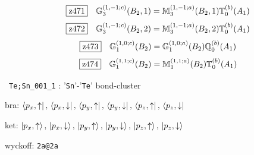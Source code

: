\documentclass[fleqn,10pt,landscape]{jsarticle}
\begin{document}
\begin{dmath*}
\hspace*{3mm}\fbox{z471}\quad \mathbb{G}_{3}^{(1,-1;c)}(B_{2},1)=\mathbb{M}_{3}^{(1,-1;a)}(B_{2},1) \mathbb{T}_{0}^{(b)}(A_{1})
\end{dmath*}
\begin{dmath*}
\hspace*{3mm}\fbox{z472}\quad \mathbb{G}_{3}^{(1,-1;c)}(B_{2},2)=\mathbb{M}_{3}^{(1,-1;a)}(B_{2},2) \mathbb{T}_{0}^{(b)}(A_{1})
\end{dmath*}
\begin{dmath*}
\hspace*{3mm}\fbox{z473}\quad \mathbb{G}_{1}^{(1,0;c)}(B_{2})=\mathbb{G}_{1}^{(1,0;a)}(B_{2}) \mathbb{Q}_{0}^{(b)}(A_{1})
\end{dmath*}
\begin{dmath*}
\hspace*{3mm}\fbox{z474}\quad \mathbb{G}_{1}^{(1,1;c)}(B_{2})=\mathbb{M}_{1}^{(1,1;a)}(B_{2}) \mathbb{T}_{0}^{(b)}(A_{1})
\end{dmath*}
\vspace{5mm}

\noindent\textbullet\, \texttt{Te;Sn_001_1} : '\texttt{Sn}'-'\texttt{Te}' bond-cluster

\noindent\quad * bra: $\bra{p_{x},\uparrow},\, \bra{p_{x},\downarrow},\, \bra{p_{y},\uparrow},\, \bra{p_{y},\downarrow},\, \bra{p_{z},\uparrow},\, \bra{p_{z},\downarrow}$

\noindent\quad * ket: $\ket{p_{x},\uparrow},\, \ket{p_{x},\downarrow},\, \ket{p_{y},\uparrow},\, \ket{p_{y},\downarrow},\, \ket{p_{z},\uparrow},\, \ket{p_{z},\downarrow}$

\noindent\quad * wyckoff: \texttt{2a@2a}
\end{document}
